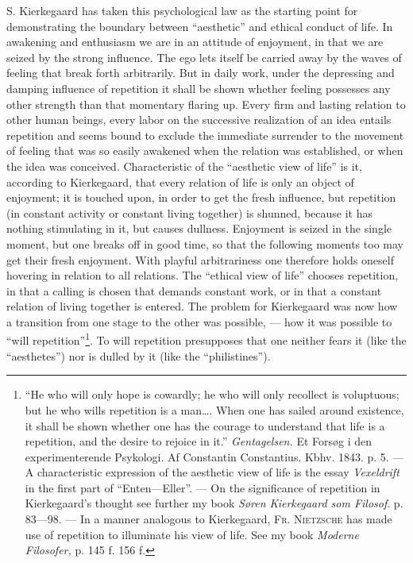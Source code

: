 \documentclass[12pt,a4paper,openany]{book}
\newcommand{\opage}[1]{\marginnote{\footnotesize\textit{[#1]}}}
\begin{document}
S. Kierkegaard has taken this psychological law as the starting point for demonstrating
the boundary between ``aesthetic'' and ethical conduct of life. In awakening and
enthusiasm we are in an attitude of enjoyment, in that we are seized by the strong
influence. The ego lets itself be carried away by the waves of feeling that break forth
arbitrarily. But in daily work, under the depressing and damping influence of repetition
\setcounter{footnote}{0}%
\opage{232}it shall be shown whether feeling possesses any other strength than that
momentary flaring up. Every firm and lasting relation to other human beings, every labor
on the successive realization of an idea entails repetition and seems bound to exclude
the immediate surrender to the movement of feeling that was so easily awakened when the
relation was established, or when the idea was conceived. Characteristic of the
``aesthetic view of life'' is it, according to Kierkegaard, that every relation of life
is only an object of enjoyment; it is touched upon, in order to get the fresh influence,
but repetition (in constant activity or constant living together) is shunned, because it
has nothing stimulating in it, but causes dullness. Enjoyment is seized in the single
moment, but one breaks off in good time, so that the following moments too may get their
fresh enjoyment. With playful arbitrariness one therefore holds oneself hovering in
relation to all relations. The ``ethical view of life'' chooses repetition, in that a
calling is chosen that demands constant work, or in that a constant relation of living
together is entered. The problem for Kierkegaard was now how a transition from one stage
to the other was possible, --- how it was possible to ``will repetition''\footnote[1]{``He who will only hope is cowardly; he who will only recollect is voluptuous; but he who wills repetition is a man\dots{}. When one has sailed around existence, it shall be shown whether one has the courage to understand that life is a repetition, and the desire to rejoice in it.'' \textit{Gentagelsen.} Et Forsøg i den experimenterende Psykologi. Af Constantin Constantius. Kbhv. 1843. p. 5. --- A characteristic expression of the aesthetic view of life is the essay \textit{Vexeldrift} in the first part of ``Enten---Eller''. --- On the significance of repetition in Kierkegaard's thought see further my book \textit{Søren Kierkegaard som Filosof}. p. 83---98. --- In a manner analogous to Kierkegaard, \textsc{Fr. Nietzsche} has made use of repetition to illuminate his view of life. See my book \textit{Moderne Filosofer,} p. 145 f. 156 f.}. To will
repetition presupposes that one neither fears it (like the ``aesthetes'') nor is dulled by
it (like the ``philistines'').
\end{document}
